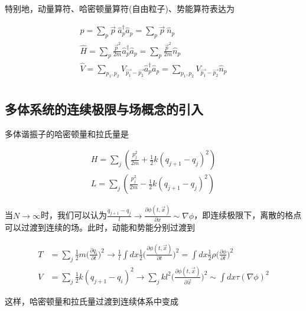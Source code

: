 特别地，动量算符、哈密顿量算符(自由粒子)、势能算符表达为

\begin{equation}
	\begin{array}{lr}
		\hat{p}= \sum_{p}\vec{p}\ \hat{a}_{p}^\dagger\hat{a}_{p}=\sum_{p}\vec{p}\ \hat{n}_{p}\\
		\hat{H}= \sum_{p}\frac{\vec{p}^2}{2m}\hat{a}_{p}^\dagger\hat{a}_{p}=\sum_{p}\frac{\vec{p}^2}{2m}\hat{n}_{p}\\
		\hat{V}= \sum_{p_{1},p_{2}}V_{\vec{p_{1}}-\vec{p_{2}}}\hat{a}_{p}^\dagger\hat{a}_{p}
           =\sum_{p_{1},p_{2}}V_{\vec{p_{1}}-\vec{p_{2}}}\hat{n}_{p}\\
	\end{array}
\end{equation}




\subsection{多体系统的连续极限与场概念的引入}

多体谐振子的哈密顿量和拉氏量是

\begin{equation}
	\begin{array}{lr}
		H=\sum_{j}(\frac{p_j^2}{2m}+\frac{1}{2}k(q_{j+1}-q_j)^2) \\
		L=\sum_{j}(\frac{p_j^2}{2m}-\frac{1}{2}k(q_{j+1}-q_j)^2)
	\end{array}
\end{equation}

当$N\to\infty$时，我们可以认为$\frac{q_{j+1}-q_j}{l}\to\frac{\partial\phi(t,\vec{x})}{\partial x}\sim\nabla\phi$，即连续极限下，离散的格点可以过渡到连续的场。此时，动能和势能分别过渡到

\begin{equation}
    \begin{split}
        T &= \sum_j\frac{1}{2}m\bigl(\frac{\partial q_i}{\partial t}\bigr)^2 \to \frac{1}{l}\int dx\frac{1}{2}\bigl(\frac{\partial\phi(t,\vec{x})}{\partial t}\bigr)^2 = \int dx\frac{1}{2}\rho\bigl(\frac{\partial\phi}{\partial t}\bigr)^2 \\
        V &= \sum_j\frac{1}{2}k(q_{j+1}-q_i)^2 \to \sum_jkl^2\bigl(\frac{\partial\phi(t,\vec{x})}{\partial \vec{x}}\bigr)^2 \sim \int dx \tau(\nabla\phi)^2
    \end{split}
\end{equation}

这样，哈密顿量和拉氏量过渡到连续体系中变成


